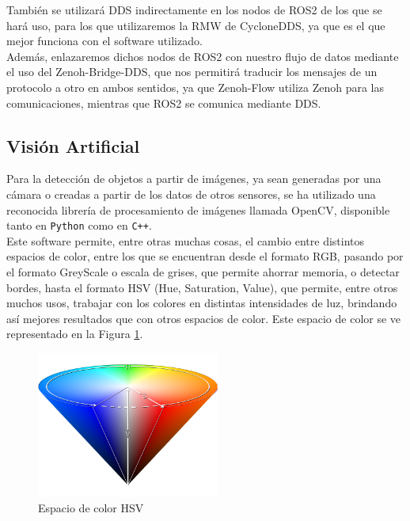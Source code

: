 También se utilizará DDS indirectamente en los nodos de ROS2 de los que se hará
uso, para los que utilizaremos la RMW de CycloneDDS, ya que es el que mejor
funciona con el software utilizado.
\\

Además, enlazaremos dichos nodos de ROS2 con nuestro flujo de datos mediante el
uso del Zenoh-Bridge-DDS, que nos permitirá traducir los mensajes de un
protocolo a otro en ambos sentidos, ya que Zenoh-Flow utiliza Zenoh para las
comunicaciones, mientras que ROS2 se comunica mediante DDS.
\\


\subsection{Visión Artificial}
\label{sec:vision_artificial}

Para la detección de objetos a partir de imágenes, ya sean generadas por una
cámara o creadas a partir de los datos de otros sensores, se ha utilizado una
reconocida librería de procesamiento de imágenes llamada OpenCV, disponible
tanto en \texttt{Python} como en \texttt{C++}.
\\

Este software permite, entre otras muchas cosas, el cambio entre distintos
espacios de color, entre los que se encuentran desde el formato RGB, pasando
por el formato GreyScale o escala de grises, que permite ahorrar memoria, o
detectar bordes, hasta el formato HSV (Hue, Saturation, Value), que permite,
entre otros muchos usos, trabajar con los colores en distintas intensidades de
luz, brindando así mejores resultados que con otros espacios de color.
Este espacio de color se ve representado en la Figura \ref{fig:hsv}.
\\

\begin{figure} [h!]
  \begin{center}
    \includegraphics[width=6cm]{figs/hsv_cone}
  \end{center}
  \caption{Espacio de color HSV \citep{hsv_cone}}
  \label{fig:hsv}
\end{figure}\


